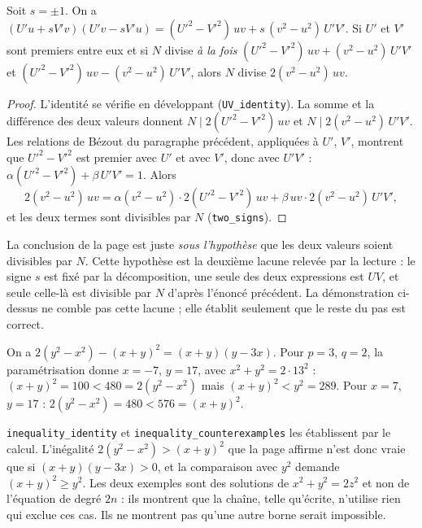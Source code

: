 \begin{enonce}
Soit $s = \pm 1$. On a $(U'u + sV'v)(U'v - sV'u) = (U'^2-V'^2)\,uv + s\,(v^2-u^2)\,U'V'$. Si $U'$ et $V'$ sont premiers entre eux et si $N$ divise \emph{à la fois} $(U'^2-V'^2)\,uv + (v^2-u^2)\,U'V'$ et $(U'^2-V'^2)\,uv - (v^2-u^2)\,U'V'$, alors $N$ divise $2(v^2-u^2)\,uv$.
\end{enonce}

\begin{proof}
L'identité se vérifie en développant (\texttt{UV\_identity}). La somme et la différence des deux valeurs donnent $N \mid 2(U'^2-V'^2)\,uv$ et $N \mid 2(v^2-u^2)\,U'V'$. Les relations de Bézout du paragraphe précédent, appliquées à $U'$, $V'$, montrent que $U'^2 - V'^2$ est premier avec $U'$ et avec $V'$, donc avec $U'V'$ : $\alpha(U'^2-V'^2) + \beta\,U'V' = 1$. Alors
\[ 2(v^2-u^2)\,uv = \alpha(v^2-u^2)\cdot 2(U'^2-V'^2)\,uv + \beta\,uv\cdot 2(v^2-u^2)\,U'V', \]
et les deux termes sont divisibles par $N$ (\texttt{two\_signs}).
\end{proof}

\begin{remarque}
La conclusion de la page est juste \emph{sous l'hypothèse} que les deux valeurs soient divisibles par $N$. Cette hypothèse est la deuxième lacune relevée par la lecture : le signe $s$ est fixé par la décomposition, une seule des deux expressions est $UV$, et seule celle-là est divisible par $N$ d'après l'énoncé précédent. La démonstration ci-dessus ne comble pas cette lacune ; elle établit seulement que le reste du pas est correct.
\end{remarque}

\begin{contrexemple}
On a $2(y^2-x^2) - (x+y)^2 = (x+y)(y-3x)$. Pour $p = 3$, $q = 2$, la paramétrisation donne $x = -7$, $y = 17$, avec $x^2+y^2 = 2\cdot 13^2$ : $(x+y)^2 = 100 < 480 = 2(y^2-x^2)$ mais $(x+y)^2 < y^2 = 289$. Pour $x = 7$, $y = 17$ : $2(y^2-x^2) = 480 < 576 = (x+y)^2$.
\end{contrexemple}

\texttt{inequality\_identity} et \texttt{inequality\_counterexamples} les établissent par le calcul. L'inégalité $2(y^2-x^2) > (x+y)^2$ que la page affirme n'est donc vraie que si $(x+y)(y-3x) > 0$, et la comparaison avec $y^2$ demande $(x+y)^2 \geq y^2$. Les deux exemples sont des solutions de $x^2+y^2 = 2z^2$ et non de l'équation de degré $2n$ : ils montrent que la chaîne, telle qu'écrite, n'utilise rien qui exclue ces cas. Ils ne montrent pas qu'une autre borne serait impossible.

